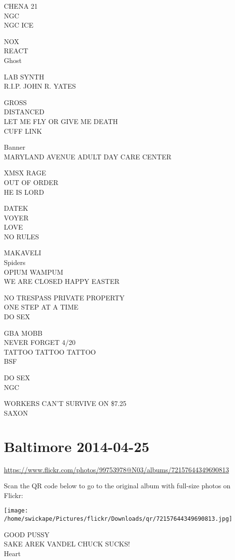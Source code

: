 \documentclass[10pt,letterpaper]{article}
\begin{document}
CHENA 21\\
NGC\\
NGC ICE

NOX\\
REACT\\
Ghost

LAB SYNTH\\
R.I.P. JOHN R. YATES

GROSS\\
DISTANCED\\
LET ME FLY OR GIVE ME DEATH\\
CUFF LINK

Banner\\
MARYLAND AVENUE ADULT DAY CARE CENTER

XMSX RAGE\\
OUT OF ORDER\\
HE IS LORD

DATEK\\
VOYER\\
LOVE\\
NO RULES

MAKAVELI\\
Spiders\\
OPIUM WAMPUM\\
WE ARE CLOSED HAPPY EASTER

NO TRESPASS PRIVATE PROPERTY\\
ONE STEP AT A TIME\\
DO SEX

GBA MOBB\\
NEVER FORGET 4/20\\
TATTOO TATTOO TATTOO\\
BSF

DO SEX\\
NGC

WORKERS CAN'T SURVIVE ON \$7.25\\
SAXON


\section*{Baltimore 2014-04-25}

\url{https://www.flickr.com/photos/99753978@N03/albums/72157644349690813}

Scan the QR code below to go to the original album with full-size photos on Flickr:

\texttt{[image: /home/swickape/Pictures/flickr/Downloads/qr/72157644349690813.jpg]}


GOOD PUSSY\\
SAKE AREK VANDEL CHUCK SUCKS!\\
Heart
\end{document}

